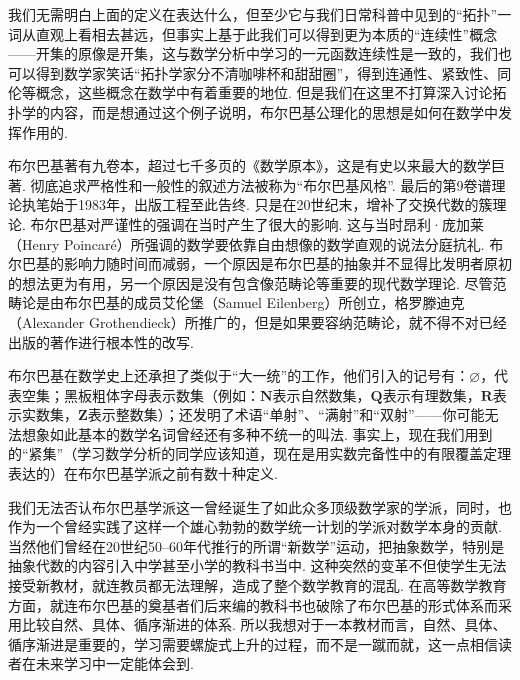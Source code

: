 我们无需明白上面的定义在表达什么，但至少它与我们日常科普中见到的``拓扑''一词从直观上看相去甚远，但事实上基于此我们可以得到更为本质的``连续性''概念——开集的原像是开集，这与数学分析中学习的一元函数连续性是一致的，我们也可以得到数学家笑话``拓扑学家分不清咖啡杯和甜甜圈''，得到连通性、紧致性、同伦等概念，这些概念在数学中有着重要的地位. 但是我们在这里不打算深入讨论拓扑学的内容，而是想通过这个例子说明，布尔巴基公理化的思想是如何在数学中发挥作用的.

布尔巴基著有九卷本，超过七千多页的《数学原本》，这是有史以来最大的数学巨著. 彻底追求严格性和一般性的叙述方法被称为``布尔巴基风格''. 最后的第9卷谱理论执笔始于1983年，出版工程至此告终. 只是在20世纪末，增补了交换代数的簇理论. 布尔巴基对严谨性的强调在当时产生了很大的影响. 这与当时昂利·庞加莱（Henry Poincar\'e）所强调的数学要依靠自由想像的数学直观的说法分庭抗礼. 布尔巴基的影响力随时间而减弱，一个原因是布尔巴基的抽象并不显得比发明者原初的想法更为有用，另一个原因是没有包含像范畴论等重要的现代数学理论. 尽管范畴论是由布尔巴基的成员艾伦堡（Samuel Eilenberg）所创立，格罗滕迪克（Alexander Grothendieck）所推广的，但是如果要容纳范畴论，就不得不对已经出版的著作进行根本性的改写.

布尔巴基在数学史上还承担了类似于``大一统''的工作，他们引入的记号有：$\varnothing$，代表空集；黑板粗体字母表示数集（例如：$\mathbf{N}$表示自然数集，$\mathbf{Q}$表示有理数集，$\mathbf{R}$表示实数集，$\mathbf{Z}$表示整数集）；还发明了术语``单射''、``满射''和``双射''——你可能无法想象如此基本的数学名词曾经还有多种不统一的叫法. 事实上，现在我们用到的``紧集''（学习数学分析的同学应该知道，现在是用实数完备性中的有限覆盖定理表达的）在布尔巴基学派之前有数十种定义.

我们无法否认布尔巴基学派这一曾经诞生了如此众多顶级数学家的学派，同时，也作为一个曾经实践了这样一个雄心勃勃的数学统一计划的学派对数学本身的贡献. 当然他们曾经在20世纪50--60年代推行的所谓``新数学''运动，把抽象数学，特别是抽象代数的内容引入中学甚至小学的教科书当中. 这种突然的变革不但使学生无法接受新教材，就连教员都无法理解，造成了整个数学教育的混乱. 在高等数学教育方面，就连布尔巴基的奠基者们后来编的教科书也破除了布尔巴基的形式体系而采用比较自然、具体、循序渐进的体系. 所以我想对于一本教材而言，自然、具体、循序渐进是重要的，学习需要螺旋式上升的过程，而不是一蹴而就，这一点相信读者在未来学习中一定能体会到.

\begin{summary}

\end{summary}

